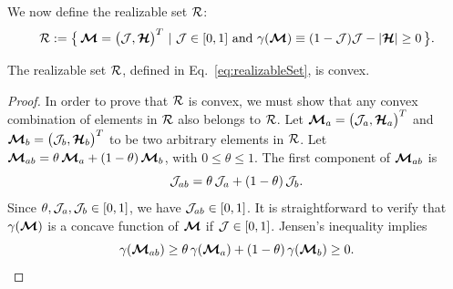 We now define the realizable set $\mathcal{R}$:
\begin{equation}
  \mathcal{R}:=\big\{\,\boldsymbol{\mathcal{M}}=\big(\mathcal{J},\boldsymbol{\mathcal{H}}\big)^{T}~|~\mathcal{J}\in[0,1]~\text{and}~\gamma(\boldsymbol{\mathcal{M}})\equiv(1-\mathcal{J})\mathcal{J}-|\boldsymbol{\mathcal{H}}|\ge0\,\big\}.
  \label{eq:realizableSet}
\end{equation}

\begin{lemma}
  The realizable set $\mathcal{R}$, defined in Eq.~\eqref{eq:realizableSet}, is convex.  
\end{lemma}
\begin{proof}
  In order to prove that $\mathcal{R}$ is convex, we must show that any convex combination of elements in $\mathcal{R}$ also belongs to $\mathcal{R}$.  
  Let $\boldsymbol{\mathcal{M}}_{a}=\big(\mathcal{J}_{a},\boldsymbol{\mathcal{H}}_{a}\big)^{T}$ and $\boldsymbol{\mathcal{M}}_{b}=\big(\mathcal{J}_{b},\boldsymbol{\mathcal{H}}_{b}\big)^{T}$ to be two arbitrary elements in $\mathcal{R}$.  
  Let $\boldsymbol{\mathcal{M}}_{ab} = \theta\,\boldsymbol{\mathcal{M}}_{a} + (1-\theta)\,\boldsymbol{\mathcal{M}}_{b}$, with $0\leq\theta\leq1$.
  The first component of $\boldsymbol{\mathcal{M}}_{ab}$ is
  \begin{equation*}
    \mathcal{J}_{ab} = \theta\,\mathcal{J}_{a} + (1-\theta)\,\mathcal{J}_{b}.
  \end{equation*}
  Since $\theta,\mathcal{J}_{a},\mathcal{J}_{b}\in[0,1]$, we have $\mathcal{J}_{ab} \in [0,1]$.  
  It is straightforward to verify that $\gamma(\boldsymbol{\mathcal{M}})$ is a concave function of $\boldsymbol{\mathcal{M}}$ if $\mathcal{J}\in[0,1]$.
  Jensen's inequality implies
  \begin{equation*}
  \gamma(\boldsymbol{\mathcal{M}}_{ab}) \geq \theta\,\gamma(\boldsymbol{\mathcal{M}}_{a}) + (1-\theta)\,\gamma(\boldsymbol{\mathcal{M}}_{b}) \ge0.
  \end{equation*}
\end{proof}

